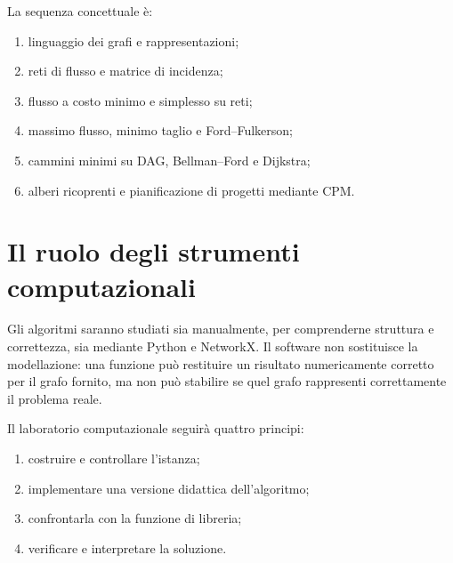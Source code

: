\documentclass[11pt,a4paper]{article}
\begin{document}
\begin{center}
\end{center}

La sequenza concettuale è:
\begin{enumerate}
\item linguaggio dei grafi e rappresentazioni;
\item reti di flusso e matrice di incidenza;
\item flusso a costo minimo e simplesso su reti;
\item massimo flusso, minimo taglio e Ford--Fulkerson;
\item cammini minimi su DAG, Bellman--Ford e Dijkstra;
\item alberi ricoprenti e pianificazione di progetti mediante CPM.
\end{enumerate}

\section{Il ruolo degli strumenti computazionali}

Gli algoritmi saranno studiati sia manualmente, per comprenderne struttura e correttezza, sia mediante Python e NetworkX. Il software non sostituisce la modellazione: una funzione può restituire un risultato numericamente corretto per il grafo fornito, ma non può stabilire se quel grafo rappresenti correttamente il problema reale.

Il laboratorio computazionale seguirà quattro principi:
\begin{enumerate}
\item costruire e controllare l'istanza;
\item implementare una versione didattica dell'algoritmo;
\item confrontarla con la funzione di libreria;
\item verificare e interpretare la soluzione.
\end{enumerate}
\end{document}
